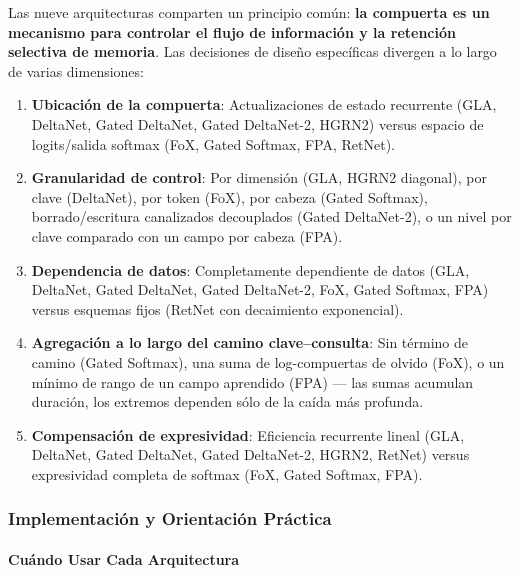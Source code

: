 Las nueve arquitecturas comparten un principio común: \textbf{la compuerta es un mecanismo para controlar el flujo de información y la retención selectiva de memoria}. Las decisiones de diseño específicas divergen a lo largo de varias dimensiones:

\begin{enumerate}[leftmargin=*]
    \item \textbf{Ubicación de la compuerta}: Actualizaciones de estado recurrente (GLA, DeltaNet, Gated DeltaNet, Gated DeltaNet-2, HGRN2) versus espacio de logits/salida softmax (FoX, Gated Softmax, FPA, RetNet).
    \item \textbf{Granularidad de control}: Por dimensión (GLA, HGRN2 diagonal), por clave (DeltaNet), por token (FoX), por cabeza (Gated Softmax), borrado/escritura canalizados decouplados (Gated DeltaNet-2), o un nivel por clave comparado con un campo por cabeza (FPA).
    \item \textbf{Dependencia de datos}: Completamente dependiente de datos (GLA, DeltaNet, Gated DeltaNet, Gated DeltaNet-2, FoX, Gated Softmax, FPA) versus esquemas fijos (RetNet con decaimiento exponencial).
    \item \textbf{Agregación a lo largo del camino clave--consulta}: Sin término de camino (Gated Softmax), una suma de log-compuertas de olvido (FoX), o un mínimo de rango de un campo aprendido (FPA) --- las sumas acumulan duración, los extremos dependen sólo de la caída más profunda.
    \item \textbf{Compensación de expresividad}: Eficiencia recurrente lineal (GLA, DeltaNet, Gated DeltaNet, Gated DeltaNet-2, HGRN2, RetNet) versus expresividad completa de softmax (FoX, Gated Softmax, FPA).
\end{enumerate}

\subsubsection{Implementación y Orientación Práctica}

\paragraph{Cuándo Usar Cada Arquitectura}

